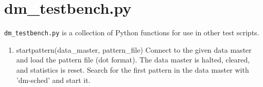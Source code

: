 \documentclass[12pt,a4paper]{report}
\begin{document}
\section{dm\_testbench.py}
\texttt{dm\_testbench.py} is a collection of Python functions for use in other test scripts.
\begin{enumerate}
\item startpattern(data\_master, pattern\_file)
    Connect to the given data master and load the pattern file (dot format).
    The data master is halted, cleared, and statistics is reset.
    Search for the first pattern in the data master with 'dm-sched' and start it.
\end{enumerate}
\end{document}
